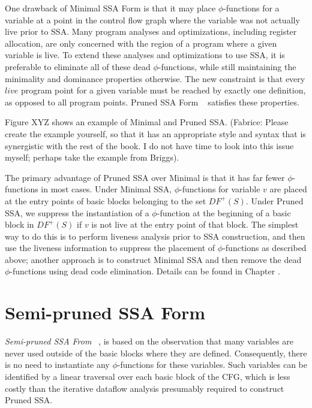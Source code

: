 One drawback of Minimal SSA Form is that it may place $\phi$-functions
for a variable at a point in the control flow graph where the variable was
not actually live prior to SSA. Many program analyses and optimizations,
including register allocation, are only concerned with the region of a 
program where a given variable is live. To extend these analyses and
optimizations to use SSA, it is preferable to eliminate all
of these dead $\phi$-functions, while still maintaining the minimality
and dominance properties otherwise. The new constraint is that every
$live$ program point for a given variable must be reached by exactly one
definition, as opposed to all program points.  Pruned SSA Form
~\cite{ChoiJan91} satisfies these properties. 

Figure XYZ shows an example of Minimal and Pruned SSA. 
(Fabrice: Please create the example yourself, so that it has an appropriate
style and syntax that is synergistic with the rest of the book. I do not have
time to look into this issue myself; perhaps take the example from Briggs). 

The primary advantage of Pruned SSA over Minimal is that it has far
fewer $\phi$-functions in most cases. 
Under Minimal SSA, $\phi$-functions for variable $v$ are placed at
the entry points of basic blocks belonging to the set $DF^{+}(S)$. 
Under Pruned SSA, we suppress the instantiation of a $\phi$-function
at the beginning of a basic block in $DF^{+}(S)$ if $v$ is not live
at the entry point of that block. The simplest way to do this is to
perform liveness analysis prior to SSA construction, and then
use the liveness information to suppress the placement of $\phi$-functions
as described above; another approach is to construct Minimal SSA
and then remove the dead $\phi$-functions using dead code
elimination. Details can be found in Chapter 
\label{chap:classical_construction}.


\section{Semi-pruned SSA Form}

\emph{Semi-pruned SSA From} ~\cite{BriggsJul98}, 
is based on the observation that
many variables are never used outside of the basic blocks
where they are defined. Consequently, there is no need 
to instantiate any $\phi$-functions for these variables.
Such variables can be identified by a linear traversal
over each basic block of the CFG, which is less costly
than the iterative dataflow analysis presumably required
to construct Pruned SSA. 
 
